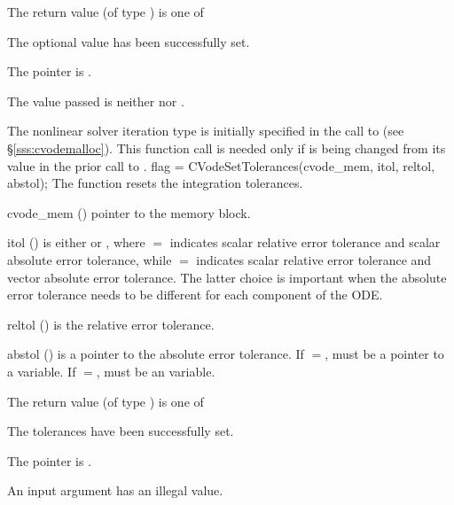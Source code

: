 {
  The return value  (of type ) is one of
  \begin{args}
  \item[\Id{CV\_SUCCESS}] 
    The optional value has been successfully set.
  \item[\Id{CV\_MEM\_NULL}]
    The  pointer is .
  \item[\Id{CV\_ILL\_INPUT}]
    The  value passed is neither  nor .
  \end{args}
}
{
  The nonlinear solver iteration type is initially specified in the call
  to  (see \S\ref{sss:cvodemalloc}). This function call is
  needed only if  is being changed from its value in the prior call 
  to .
}
{
flag = CVodeSetTolerances(cvode\_mem, itol, reltol, abstol);
}
{
  The function  resets the integration tolerances.
}
{
  \begin{args}
  \item[cvode\_mem] ()
    pointer to the {\cvode} memory block.
  \item[itol] () 
    is either  or , where $=$ indicates
    scalar relative error tolerance and scalar absolute error tolerance, while
    $=$ indicates scalar relative error tolerance and vector
    absolute error tolerance.  The latter choice is important when the absolute
    error tolerance needs to be different for each component of the ODE. 
  \item[reltol] ()
    is the relative error tolerance.
  \item[abstol] ()
    is a pointer to the absolute error tolerance. If $=$, 
    must be a pointer to a  variable. If $=$, 
    must be an  variable.
  \end{args}
}
{
  The return value  (of type ) is one of
  \begin{args}
  \item[\Id{CV\_SUCCESS}] 
    The tolerances have been successfully set.
  \item[\Id{CV\_MEM\_NULL}]
    The  pointer is .
  \item[\Id{CV\_ILL\_INPUT}]
    An input argument has an illegal value.
  \end{args}
}
